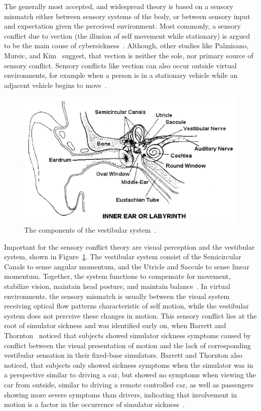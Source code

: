 The generally most accepted, and widespread theory is based on a sensory mismatch either between sensory systems of the
body, or between sensory input and expectation given the perceived environment.
Most commonly, a sensory conflict due to vection (the illusion of self movement while stationary) is argued to be the
main cause of cybersickness~\cite{Weech2018,Keshavarz2019}.
Although, other studies like Palmisano, Mursic, and Kim~\cite{Palmisano2017} suggest, that vection is neither the
sole, nor primary source of sensory conflict.
Sensory conflicts like vection can also occur outside virtual environments, for example when a person is in a
stationary vehicle while an adjacent vehicle begins to move~\cite{LaViola2000}.

\begin{figure}[h]
    \centering
    \includegraphics[width=\textwidth]{content/2_related_work/img/VestibularSystem[LaViola2000]}
    \caption{The components of the vestibular system~\cite{LaViola2000}.}
    \label{fig:vestibular-system}
\end{figure}
Important for the sensory conflict theory are visual perception and the vestibular system, shown in
Figure~\ref{fig:vestibular-system}.
The vestibular system consist of the Semicircular Canals to sense angular momentum, and the Utricle and Saccule to
sense linear momentum.
Together, the system functions to compensate for movement, stabilize vision, maintain head posture, and maintain
balance~\cite{Walker2014}.
In virtual environments, the sensory mismatch is usually between the visual system receiving optical flow patterns
characteristic of self motion, while the vestibular system does not perceive these changes in motion.
This sensory conflict lies at the root of simulator sickness and was identified early on, when Barrett and
Thornton~\cite{Barrett1968} noticed that subjects showed simulator sickness symptoms caused by conflict between the
visual presentation of motion and the lack of corresponding vestibular sensation in their fixed-base simulators.
Barrett and Thornton also noticed, that subjects only showed sickness symptoms when the simulator was in a
perspective similar to driving a car, but showed no symptoms when viewing the car from outside, similar to driving a
remote controlled car, as well as passengers showing more severe symptoms than drivers, indicating
that involvement in motion is a factor in the occurrence of simulator sickness~\cite{Tiiro2018,Barrett1968}.

